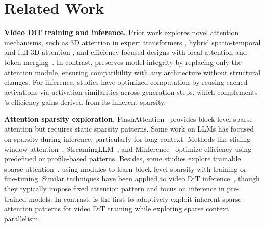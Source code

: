 \section{Related Work}
\noindent\textbf{Video DiT training and inference.} Prior work explores novel attention mechanisms, such as 3D attention in expert transformers \cite{xu2024easyanimate}, hybrid spatio-temporal and full 3D attention \cite{HunyuanVideo}, and efficiency-focused designs with local attention and token merging~\cite{wang2024qihoot2xefficiencyfocuseddiffusiontransformer,pu2024efficient}. In contrast, \sys preserves model integrity by replacing only the attention module, ensuring compatibility with any architecture without structural changes. For inference, studies \cite{yuan2024ditfastattnattentioncompressiondiffusion,sun2024unveiling,kahatapitiya2024adaptive} have optimized computation by reusing cached activations via activation similarities across generation steps, which complements \sys's efficiency gains derived from its inherent sparsity.







\noindent\textbf{Attention sparsity exploration.} FlashAttention~\cite{dao2022flashattention1,dao2023flashattention2} provides block-level sparse attention but requires static sparsity patterns. Some work on LLMs has focused on sparsity during inference, particularly for long context. Methods like sliding window attention~\cite{mistral7b}, StreamingLLM~\cite{xiao2023streamllm}, and Minference~\cite{jiang2024minference} optimize efficiency using predefined or profile-based patterns. Besides, some studies explore trainable sparse attention~\cite{gao2024seerattention,yuan2025native}, using modules to learn block-level sparsity with training or fine-tuning. Similar techniques have been applied to video DiT inference~\cite{xi2025sparse,zhang2025fastvideotileatten}, though they typically impose fixed attention pattern and focus on inference in pre-trained models. 
In contrast, \sys is the first to adaptively exploit inherent sparse attention patterns for video DiT training while exploring sparse context parallelism.

